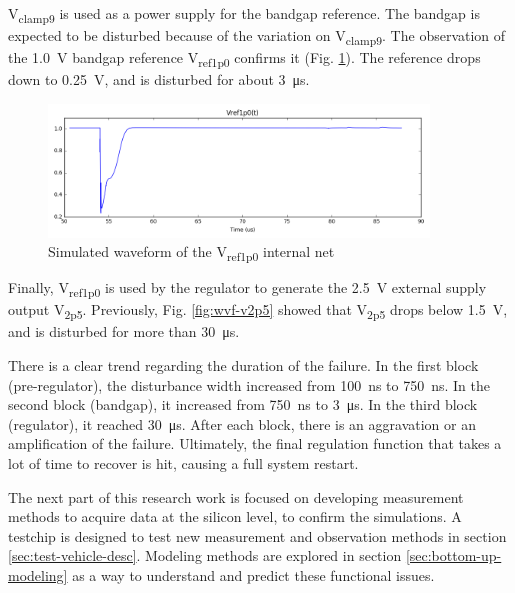 V\textsubscript{clamp9} is used as a power supply for the bandgap reference.
The bandgap is expected to be disturbed because of the variation on V\textsubscript{clamp9}.
The observation of the \SI{1.0}{\volt} bandgap reference V\textsubscript{ref1p0} confirms it (Fig. \ref{fig:wvf-v1p0}).
The reference drops down to \SI{0.25}{\volt}, and is disturbed for about \SI{3}{\micro\second}.

\begin{figure}[!h]
  \centering
  \includegraphics[width=0.9\textwidth]{src/3/figures/v1p0.png}
  \caption{Simulated waveform of the V\textsubscript{ref1p0} internal net}
  \label{fig:wvf-v1p0}
\end{figure}

Finally, V\textsubscript{ref1p0} is used by the regulator to generate the \SI{2.5}{\volt} external supply output V\textsubscript{2p5}.
Previously,  Fig. \ref{fig:wvf-v2p5} showed that V\textsubscript{2p5} drops below \SI{1.5}{\volt}, and is disturbed for more than \SI{30}{\micro\second}.

There is a clear trend regarding the duration of the failure.
In the first block (pre-regulator), the disturbance width increased from \SI{100}{\nano\second} to \SI{750}{\nano\second}.
In the second block (bandgap), it increased from \SI{750}{\nano\second} to \SI{3}{\micro\second}.
In the third block (regulator), it reached \SI{30}{\micro\second}.
After each block, there is an aggravation or an amplification of the failure.
Ultimately, the final regulation function that takes a lot of time to recover is hit, causing a full system restart.

The next part of this research work is focused on developing measurement methods to acquire data at the silicon level, to confirm the simulations.
A testchip is designed to test new measurement and observation methods in section \ref{sec:test-vehicle-desc}.
Modeling methods are explored in section \ref{sec:bottom-up-modeling} as a way to understand and predict these functional issues.
